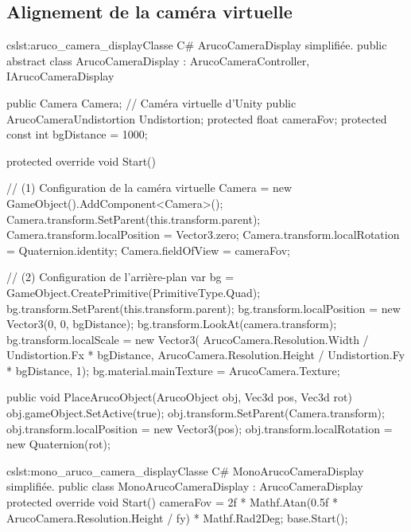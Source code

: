 
\subsection{Alignement de la caméra virtuelle}
\label{subsec:pinhole_camera_display}

\begin{listingETS}{cs}{lst:aruco_camera_display}{Classe C\# ArucoCameraDisplay simplifiée.}
  public abstract class ArucoCameraDisplay : ArucoCameraController, IArucoCameraDisplay
  {
    public Camera Camera; // Caméra virtuelle d'Unity
    public ArucoCameraUndistortion Undistortion;
    protected float cameraFov;
    protected const int bgDistance = 1000;

    protected override void Start()
    {
      // (1) Configuration de la caméra virtuelle
      Camera = new GameObject().AddComponent<Camera>();
      Camera.transform.SetParent(this.transform.parent);
      Camera.transform.localPosition = Vector3.zero;
      Camera.transform.localRotation = Quaternion.identity;
      Camera.fieldOfView = cameraFov;

      // (2) Configuration de l'arrière-plan
      var bg = GameObject.CreatePrimitive(PrimitiveType.Quad);
      bg.transform.SetParent(this.transform.parent);
      bg.transform.localPosition = new Vector3(0, 0, bgDistance);
      bg.transform.LookAt(camera.transform);
      bg.transform.localScale = new Vector3(
        ArucoCamera.Resolution.Width / Undistortion.Fx * bgDistance,
        ArucoCamera.Resolution.Height / Undistortion.Fy * bgDistance, 1);
      bg.material.mainTexture = ArucoCamera.Texture;
    }

    public void PlaceArucoObject(ArucoObject obj, Vec3d pos, Vec3d rot)
    {
      obj.gameObject.SetActive(true);
      obj.transform.SetParent(Camera.transform);
      obj.transform.localPosition = new Vector3(pos);
      obj.transform.localRotation = new Quaternion(rot);
    }
  }
\end{listingETS}

\begin{listingETS}{cs}{lst:mono_aruco_camera_display}{Classe C\# MonoArucoCameraDisplay simplifiée.}
  public class MonoArucoCameraDisplay : ArucoCameraDisplay
  {
    protected override void Start()
    {
      cameraFov = 2f * Mathf.Atan(0.5f * ArucoCamera.Resolution.Height / fy) * Mathf.Rad2Deg;
      base.Start();
    }
  }
\end{listingETS}

